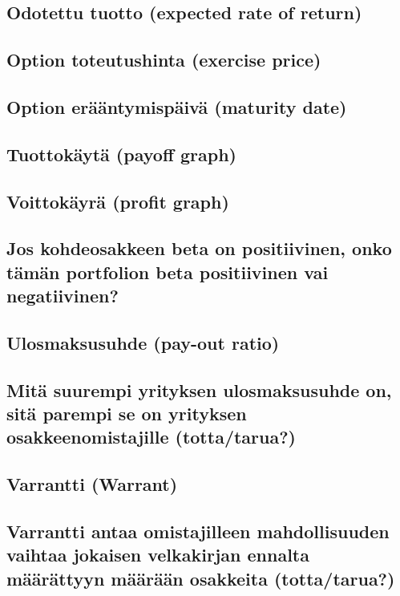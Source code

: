\documentclass[a4paper]{article}
\begin{document}
\subsection{Odotettu tuotto (expected rate of return)}

\subsection{Option toteutushinta (exercise price)}

\subsection{Option erääntymispäivä (maturity date)}

\subsection{Tuottokäytä (payoff graph)}

\subsection{Voittokäyrä (profit graph)}

\subsection{Jos kohdeosakkeen beta on positiivinen, onko tämän portfolion beta positiivinen vai negatiivinen?}

\subsection{Ulosmaksusuhde (pay-out ratio)}

\subsection{Mitä suurempi yrityksen ulosmaksusuhde on, sitä parempi se on yrityksen osakkeenomistajille (totta/tarua?)}

\subsection{Varrantti (Warrant)}

\subsection{Varrantti antaa omistajilleen mahdollisuuden vaihtaa jokaisen velkakirjan ennalta määrättyyn määrään osakkeita (totta/tarua?)}
\end{document}
